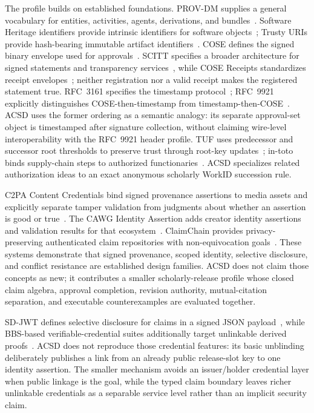 \documentclass[11pt]{article}
\begin{document}
The profile builds on established foundations. PROV-DM supplies a general vocabulary for entities, activities, agents, derivations, and bundles~\cite{prov}. Software Heritage identifiers provide intrinsic identifiers for software objects~\cite{swhid}; Trusty URIs provide hash-bearing immutable artifact identifiers~\cite{trusty}. COSE defines the signed binary envelope used for approvals~\cite{cose}. SCITT specifies a broader architecture for signed statements and transparency services~\cite{scitt}, while COSE Receipts standardizes receipt envelopes~\cite{cosereceipts}; neither registration nor a valid receipt makes the registered statement true. RFC~3161 specifies the timestamp protocol~\cite{rfc3161}; RFC~9921 explicitly distinguishes COSE-then-timestamp from timestamp-then-COSE~\cite{rfc9921}. ACSD uses the former ordering as a semantic analogy: its separate approval-set object is timestamped after signature collection, without claiming wire-level interoperability with the RFC~9921 header profile. TUF uses predecessor and successor root thresholds to preserve trust through root-key updates~\cite{tufspec}; in-toto binds supply-chain steps to authorized functionaries~\cite{intoto}. ACSD specializes related authorization ideas to an exact anonymous scholarly WorkID succession rule.

C2PA Content Credentials bind signed provenance assertions to media assets and
explicitly separate tamper validation from judgments about whether an assertion
is good or true~\cite{c2pa}. The CAWG Identity Assertion adds creator identity
assertions and validation results for that ecosystem~\cite{cawg}. ClaimChain
provides privacy-preserving authenticated claim repositories with
non-equivocation goals~\cite{claimchain}. These systems demonstrate that signed
provenance, scoped identity, selective disclosure, and conflict resistance are
established design families. ACSD does not claim those concepts as new; it
contributes a smaller scholarly-release profile whose closed claim algebra,
approval completion, revision authority, mutual-citation separation, and
executable counterexamples are evaluated together.

SD-JWT defines selective disclosure for claims in a signed JSON payload~\cite{sdjwt}, while BBS-based verifiable-credential suites additionally target unlinkable derived proofs~\cite{bbs}. ACSD does not reproduce those credential features: its basic unblinding deliberately publishes a link from an already public release-slot key to one identity assertion. The smaller mechanism avoids an issuer/holder credential layer when public linkage is the goal, while the typed claim boundary leaves richer unlinkable credentials as a separable service level rather than an implicit security claim.
\end{document}
